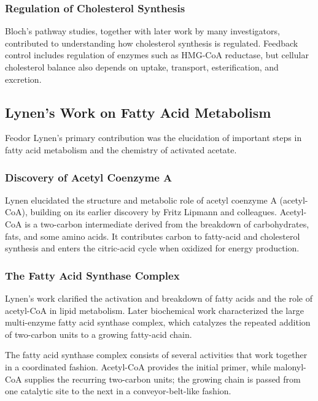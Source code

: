 \subsubsection{Regulation of Cholesterol Synthesis}

Bloch's pathway studies, together with later work by many investigators, contributed to understanding how cholesterol synthesis is regulated. Feedback control includes regulation of enzymes such as HMG-CoA reductase, but cellular cholesterol balance also depends on uptake, transport, esterification, and excretion.

\subsection{Lynen's Work on Fatty Acid Metabolism}

Feodor Lynen's primary contribution was the elucidation of important steps in fatty acid metabolism and the chemistry of activated acetate.

\subsubsection{Discovery of Acetyl Coenzyme A}

Lynen elucidated the structure and metabolic role of acetyl coenzyme A (acetyl-CoA), building on its earlier discovery by Fritz Lipmann and colleagues. Acetyl-CoA is a two-carbon intermediate derived from the breakdown of carbohydrates, fats, and some amino acids. It contributes carbon to fatty-acid and cholesterol synthesis and enters the citric-acid cycle when oxidized for energy production.

\subsubsection{The Fatty Acid Synthase Complex}

Lynen's work clarified the activation and breakdown of fatty acids and the role of acetyl-CoA in lipid metabolism. Later biochemical work characterized the large multi-enzyme fatty acid synthase complex, which catalyzes the repeated addition of two-carbon units to a growing fatty-acid chain.

The fatty acid synthase complex consists of several activities that work together in a coordinated fashion. Acetyl-CoA provides the initial primer, while malonyl-CoA supplies the recurring two-carbon units; the growing chain is passed from one catalytic site to the next in a conveyor-belt-like fashion.

